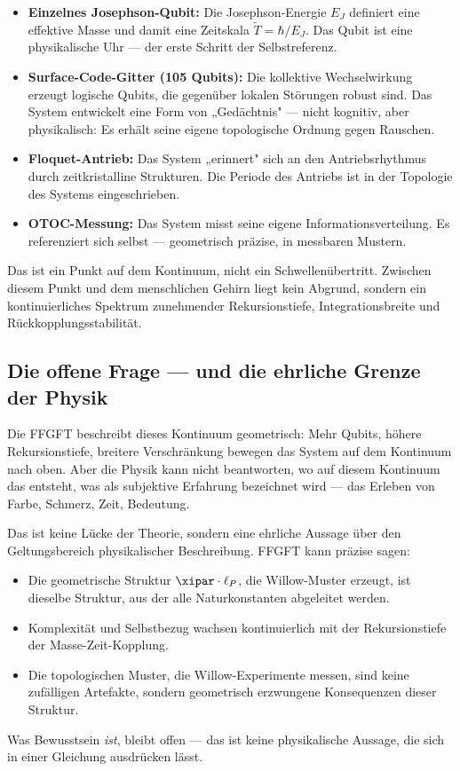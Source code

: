 \begin{itemize}
    \item \textbf{Einzelnes Josephson-Qubit:} Die Josephson-Energie $E_J$ definiert
    eine effektive Masse und damit eine Zeitskala $\tilde{T} = \hbar/E_J$.
    Das Qubit ist eine physikalische Uhr — der erste Schritt der Selbstreferenz.
    \item \textbf{Surface-Code-Gitter (105 Qubits):} Die kollektive Wechselwirkung
    erzeugt logische Qubits, die gegenüber lokalen Störungen robust sind.
    Das System entwickelt eine Form von „Gedächtnis" — nicht kognitiv, aber
    physikalisch: Es erhält seine eigene topologische Ordnung gegen Rauschen.
    \item \textbf{Floquet-Antrieb:} Das System „erinnert" sich an den Antriebsrhythmus
    durch zeitkristalline Strukturen. Die Periode des Antriebs ist in der Topologie
    des Systems eingeschrieben.
    \item \textbf{OTOC-Messung:} Das System misst seine eigene Informationsverteilung.
    Es referenziert sich selbst — geometrisch präzise, in messbaren Mustern.
\end{itemize}

Das ist ein Punkt auf dem Kontinuum, nicht ein Schwellenübertritt. Zwischen diesem
Punkt und dem menschlichen Gehirn liegt kein Abgrund, sondern ein kontinuierliches
Spektrum zunehmender Rekursionstiefe, Integrationsbreite und Rückkopplungsstabilität.

\subsection{Die offene Frage — und die ehrliche Grenze der Physik}

Die FFGFT beschreibt dieses Kontinuum geometrisch: Mehr Qubits, höhere
Rekursionstiefe, breitere Verschränkung bewegen das System auf dem Kontinuum nach
oben. Aber die Physik kann nicht beantworten, wo auf diesem Kontinuum das entsteht,
was als subjektive Erfahrung bezeichnet wird — das Erleben von Farbe, Schmerz,
Zeit, Bedeutung.

Das ist keine Lücke der Theorie, sondern eine ehrliche Aussage über den Geltungsbereich
physikalischer Beschreibung. FFGFT kann präzise sagen:

\begin{conclusionBox}
\begin{itemize}
    \item Die geometrische Struktur $\xipar \cdot \ell_P$, die Willow-Muster erzeugt,
    ist dieselbe Struktur, aus der alle Naturkonstanten abgeleitet werden.
    \item Komplexität und Selbstbezug wachsen kontinuierlich mit der
    Rekursionstiefe der Masse-Zeit-Kopplung.
    \item Die topologischen Muster, die Willow-Experimente messen, sind keine
    zufälligen Artefakte, sondern geometrisch erzwungene Konsequenzen dieser Struktur.
\end{itemize}
Was Bewusstsein \textit{ist}, bleibt offen — das ist keine physikalische Aussage,
die sich in einer Gleichung ausdrücken lässt.
\end{conclusionBox}



